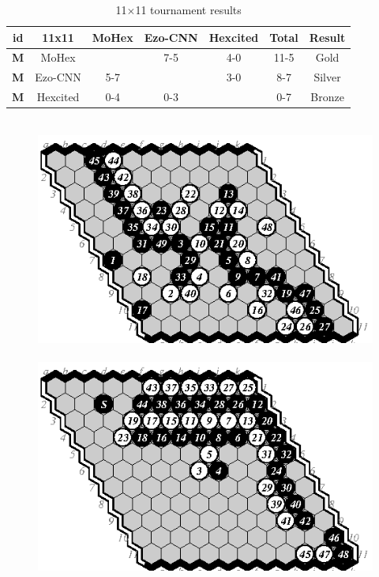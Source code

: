 \documentclass{IOS-Book-Article}
\def\Ec{\mbox{\sc Ezo-CNN}}
\def\Hite{\mbox{\sc Hexcited}}
\def\Mx{\mbox{\sc MoHex}}
\begin{document}
\begin{table}
\begin{tabular}{|c|c|c|c|c|c|c|}
\hline {\bf id} & {\bf 11x11} &\Mx{} &\Ec{}  & \Hite{}  
                & {\bf Total} & {\bf Result} \\ 
\hline {\bf M} & \Mx{}         &      &  7-5  &  4-0   & 11-5  &  Gold \\
\hline {\bf M} & \Ec{}         &  5-7 &       &  3-0   & 8-7   &  Silver \\
\hline {\bf M} & \Hite{}       &  0-4 &  0-3  &        & 0-7   &  Bronze \\
\hline
\end{tabular}
\caption{11$\times$11 tournament results}
\label{tab:tour1}
\end{table}

\begin{figure}
\hspace*{-2cm}\
\includegraphics[scale=.9]{pix/11.mh1.eps}\hspace*{-1.5cm}\
\includegraphics[scale=.9]{pix/11.hm2.eps}\hspace*{-1.5cm}\

\end{figure}
\end{document}

